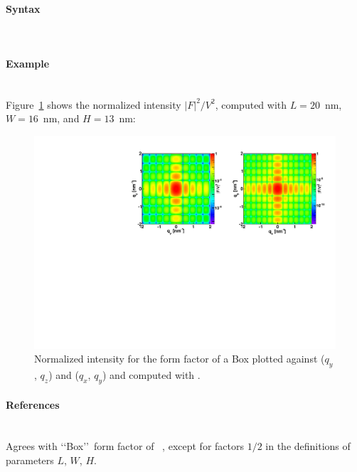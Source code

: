 \paragraph{Syntax}\strut\\

\newpage

\paragraph{Example}\strut\\
Figure~\ref{fig:FFBoxEx} shows the normalized intensity
$|F|^2/V^2$, computed with $L=20$~nm, $W=16$~nm, and $H=13$~nm:

\begin{figure}[ht]
\begin{center}
\includegraphics[angle=-90,width=\textwidth]{fig/ff/figffbox.pdf}
\end{center}
\caption{Normalized intensity for the form factor of a Box plotted against ($q_y$, $q_z$) and  ($q_x$, $q_y$) and computed with .}
\label{fig:FFBoxEx}
\end{figure}

\paragraph{References}\strut\\
Agrees with \lq\lq Box\rq\rq\ form factor of \IsGISAXS~\cite{Laz02},
except for factors $1/2$ in the definitions of parameters $L$, $W$, $H$.

\newpage
